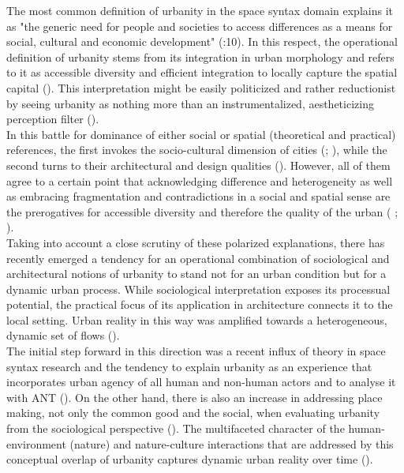 \documentclass[11pt]{report}
\begin{document}
{{{The most common definition of urbanity in the space syntax domain explains it as "the generic need for people and societies to access differences as a means for social, cultural and economic development" (\href{Marcus}{\citealt{marcus_spatial_2007}}:10).
In this respect, the operational definition of urbanity stems from its integration in urban morphology  and refers to it as accessible diversity and efficient integration to locally capture the spatial capital (\href{Marcus}{\cite{marcus_spatial_2007}}).
This interpretation might be easily politicized and rather reductionist by seeing urbanity as nothing more than an instrumentalized, aestheticizing perception filter (\href{Wuest}{\citealt{wust_urbanity_2005}}).
\\

In this battle for dominance of either social or spatial (theoretical and practical) references, the first invokes the socio-cultural dimension of cities (\href{ref}{\cite{haussermann_urbanitet:_1992}}; \href{ref}{ \citealt{Christiaanse 2000}}), while the second turns to their architectural and design qualities (\cite{Neuffer 1976}).
However, all of them agree to a certain point that acknowledging difference and heterogeneity as well as embracing fragmentation and contradictions in a social and spatial sense are the prerogatives for accessible diversity and therefore the quality of the urban (\cite{(Durth 1986: Krämer-Badoni 1996} \href{Wuest}{\citealt{wust_urbanity_2005}}; \href{Markus}{\cite{marcus_spatial_2007}}). 
\\

Taking into account a close scrutiny of these polarized explanations, there has recently emerged a tendency for an operational combination of sociological and architectural notions of urbanity to stand not for an urban condition but for a dynamic urban process.
While sociological interpretation exposes its processual potential, the practical focus of its application in architecture connects it to the local setting.
Urban reality in this way was amplified towards a heterogeneous, dynamic set of flows (\href{de Aguiar}{\citealt{de_aguiar_douglas_vieira_what_2013}}).
\\

The initial step forward in this direction was a recent influx of theory in space syntax research and the tendency to explain urbanity as an experience that incorporates urban agency of all human and non-human actors and to analyse it with ANT (\citealt{(Rheintantz 2012)}).
On the other hand, there is also an increase in addressing place making, not only the common good and the social, when evaluating urbanity from the sociological perspective (\href{Holden}{\citealt{holden_justifying_2015}}). 
The multifaceted character of the human-environment (nature) and nature-culture interactions that are addressed by this conceptual overlap of urbanity captures dynamic urban reality over time (\href{Tardin}{\citealt{tardin_landscape_2014}}).
\\

}}}
\end{document}
